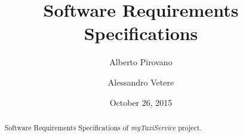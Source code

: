 \documentclass{article}      %
\title{Software Requirements Specifications}    %
\author{Alberto Pirovano \and Alessandro Vetere}      %
\date{October 26, 2015}      %
\newcommand{\myTaxiService}[0]{\mbox{\emph{myTaxiService}}}
\newcommand{\sectionBaseDir}[1]{./section_#1} %
\newcommand{\sectionTexPath}[1]{\sectionBaseDir{#1}/section_#1.tex}
\newcommand{\inputSection}[1]{\newpage}}
\begin{document}
\maketitle
\begin{abstract} %
	Software Requirements Specifications of \myTaxiService{} project.
\end{abstract} %
\newpage
\tableofcontents             %
\inputSection{1}
\inputSection{2}
\inputSection{3}
\end{document}
